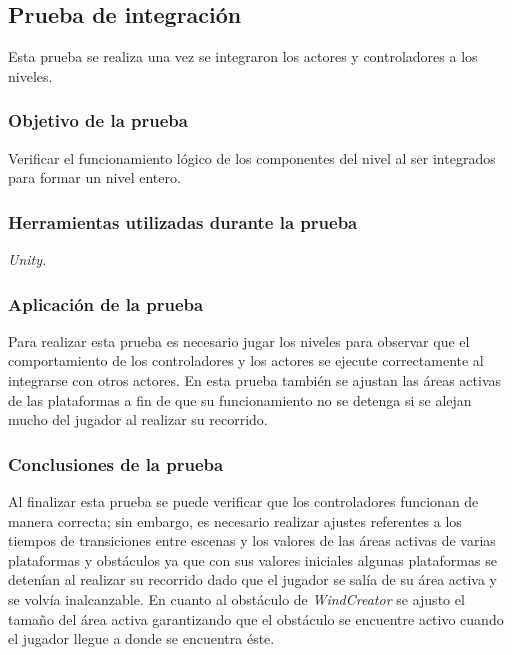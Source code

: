 \subsection{Prueba de integración}
Esta prueba se realiza una vez se integraron los actores y controladores a los
niveles.
\subsubsection{Objetivo de la prueba}
Verificar el funcionamiento lógico de los componentes del nivel al ser integrados
para formar un nivel entero.
\subsubsection{Herramientas utilizadas durante la prueba}
\textit{Unity.}
\subsubsection{Aplicación de la prueba}
Para realizar esta prueba es necesario jugar los niveles para observar que el
comportamiento de los controladores y los actores se ejecute correctamente al
integrarse con otros actores. En esta prueba también se ajustan las áreas activas de las
plataformas a fin de que su funcionamiento no se detenga si se alejan mucho del
jugador al realizar su recorrido.
                
\subsubsection{Conclusiones de la prueba}
Al finalizar esta prueba se puede verificar que los controladores funcionan de
manera correcta; sin embargo, es necesario realizar ajustes referentes a los
tiempos de transiciones entre escenas y los valores de las áreas activas de
varias plataformas y obstáculos ya que con sus valores iniciales algunas
plataformas se detenían al realizar su recorrido dado que el jugador se salía
de su área activa y se volvía inalcanzable. En cuanto al obstáculo de
\textit{WindCreator} se ajusto el tamaño del área activa garantizando que el
obstáculo se encuentre activo cuando el jugador llegue a donde se encuentra éste.  